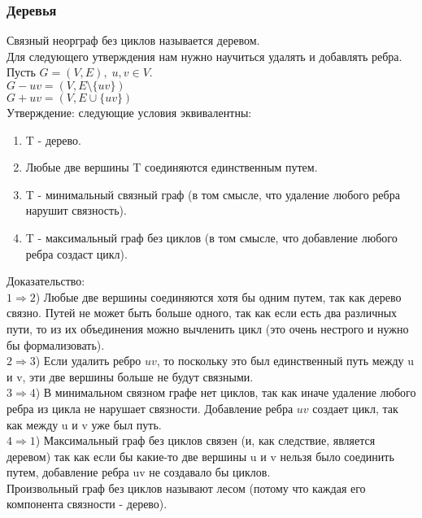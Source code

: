 \subsubsection{Деревья}
Связный неорграф без циклов называется деревом.\\
Для следующего утверждения нам нужно научиться удалять и добавлять ребра.\\
Пусть $G = (V, E), \; u, v \in V$. \\
$G - uv = (V, E \setminus \{uv\})$\\
$G + uv = (V, E \cup \{uv\})$\\
Утверждение: следующие условия эквивалентны:\\
\begin{enumerate}
\item T - дерево.\\
\item Любые две вершины T соединяются единственным путем.\\
\item T - минимальный связный граф (в том смысле, что удаление любого ребра нарушит связность).\\
\item T - максимальный граф без циклов (в том смысле, что добавление любого ребра создаст цикл).\\
\end{enumerate}
Доказательство:\\
$1 \Rightarrow 2$) Любые две вершины соединяются хотя бы одним путем, так как дерево связно. Путей не может быть больше одного, так как если есть два различных пути, то из их объединения можно вычленить цикл (это очень нестрого и нужно бы формализовать).\\
$2 \Rightarrow 3$) Если удалить ребро $uv$, то поскольку это был единственный путь между u и v, эти две вершины больше не будут связными.\\
$3 \Rightarrow 4$) В минимальном связном графе нет циклов, так как иначе удаление любого ребра из цикла не нарушает связности. Добавление ребра $uv$ создает цикл, так как между u и v уже был путь.\\
$4 \Rightarrow 1$) Максимальный граф без циклов связен (и, как следствие, является деревом) так как если бы какие-то две вершины u и v нельзя было соединить путем, добавление ребра uv не создавало бы циклов.\\
Произвольный граф без циклов называют лесом (потому что каждая его компонента связности - дерево).\\
